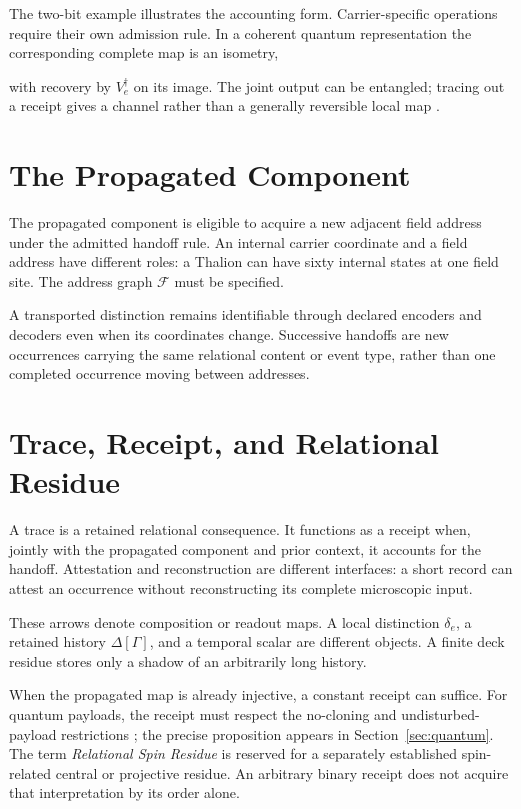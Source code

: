 
The two-bit example illustrates the accounting form. Carrier-specific operations require their own admission rule. In a coherent quantum representation the corresponding complete map is an isometry,

with recovery by $V_e^\dagger$ on its image. The joint output can be entangled; tracing out a receipt gives a channel rather than a generally reversible local map \citep{watrous2018}.

\section{The Propagated Component}
The propagated component is eligible to acquire a new adjacent field address under the admitted handoff rule. An internal carrier coordinate and a field address have different roles: a Thalion can have sixty internal states at one field site. The address graph $\mathcal F$ must be specified.

A transported distinction remains identifiable through declared encoders and decoders even when its coordinates change. Successive handoffs are new occurrences carrying the same relational content or event type, rather than one completed occurrence moving between addresses.

\section{Trace, Receipt, and Relational Residue}\label{sec:receipts}
A trace is a retained relational consequence. It functions as a receipt when, jointly with the propagated component and prior context, it accounts for the handoff. Attestation and reconstruction are different interfaces: a short record can attest an occurrence without reconstructing its complete microscopic input.

These arrows denote composition or readout maps. A local distinction $\delta_e$, a retained history $\Delta[\Gamma]$, and a temporal scalar are different objects. A finite deck residue stores only a shadow of an arbitrarily long history.

When the propagated map is already injective, a constant receipt can suffice. For quantum payloads, the receipt must respect the no-cloning and undisturbed-payload restrictions \citep{wootterszurek1982}; the precise proposition appears in Section~\ref{sec:quantum}. The term \emph{Relational Spin Residue} is reserved for a separately established spin-related central or projective residue. An arbitrary binary receipt does not acquire that interpretation by its order alone.

